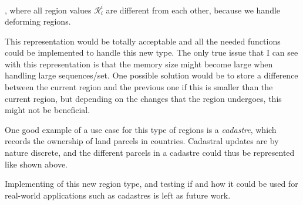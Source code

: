 , where all region values $\mathcal{R}_i^i$ are different from each other, because we handle deforming regions.

This representation would be totally acceptable and all the needed functions could be implemented to handle this new type. The only true issue that I can see with this representation is that the memory size might become large when handling large sequences/set. One possible solution would be to store a difference between the current region and the previous one if this is smaller than the current region, but depending on the changes that the region undergoes, this might not be beneficial.

One good example of a use case for this type of regions is a \textit{cadastre}, which records the ownership of land parcels in countries. Cadastral updates are by nature discrete, and the different parcels in a cadastre could thus be represented like shown above.

Implementing of this new region type, and testing if and how it could be used for real-world applications such as cadastres is left as future work.
